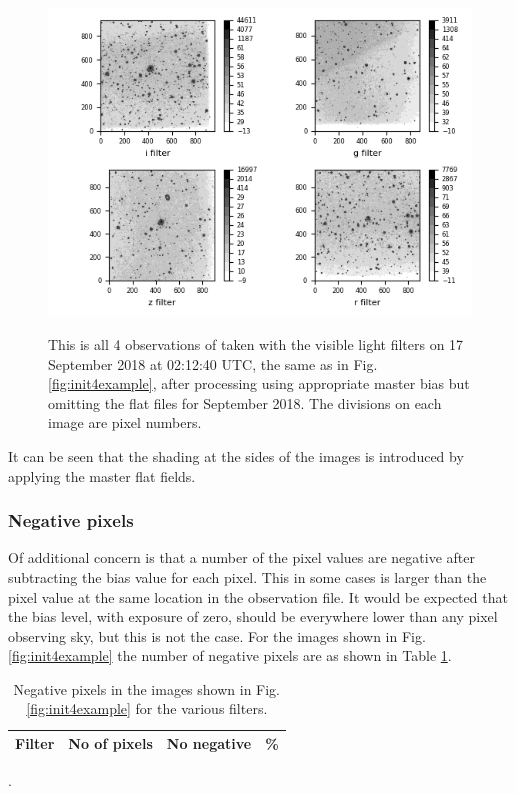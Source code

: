 \begin{figure}[!htbp]
\begin{center}
\includegraphics[scale=1]{images/init4exnoflat.png}
\end{center}   
\caption{This is all 4 observations of {\prox} taken with the visible light
filters on 17 September 2018 at 02:12:40 UTC, the same as in Fig.
\ref{fig:init4example}, after processing using appropriate master bias but
omitting the flat files for September 2018. The divisions on each image are pixel numbers.}
\protect\label{fig:init4exnoflat}
\end{figure}

It can be seen that the shading at the sides of the images is introduced by
applying the master flat fields.

\subsubsection{Negative pixels}
\protect\label{section:issuenegpixels}

Of additional concern is that a number of the pixel values are
negative after subtracting the bias value for each pixel. This in some cases is
larger than the pixel value at the same location in the observation file.
It would be expected that the bias level, with exposure of zero, should be
everywhere lower than any pixel observing sky, but this is not the case. For the images shown in Fig.
\ref{fig:init4example} the number of negative pixels are as shown in Table
\ref{table:initexnegpix}.

\begin{table}[!htbp]
\begin{center}
\begin{tabular}{lrrr} \hline
Filter & No of pixels & No negative & \% \\\hline

\hline
\end{tabular}
\end{center}
\caption{Negative pixels in the images shown in Fig. \ref{fig:init4example} for
the various filters.}.
\protect\label{table:initexnegpix}
\end{table}

